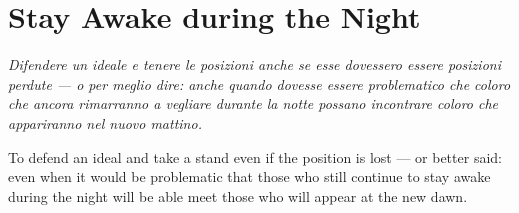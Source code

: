 \section{Stay Awake during the Night}

\begin{quotex}
\textit{Difendere un ideale e tenere le posizioni anche se esse dovessero essere posizioni perdute --- o per meglio dire: anche quando dovesse essere problematico che coloro che ancora rimarranno a vegliare durante la notte possano incontrare coloro che appariranno nel nuovo mattino.}

To defend an ideal and take a stand even if the position is lost --- or better said: even when it would be problematic that those who still continue to stay awake during the night will be able meet those who will appear at the new dawn.


\end{quotex}




